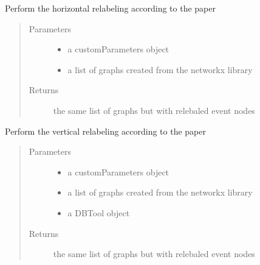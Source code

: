 \documentclass[letterpaper,10pt,english]{sphinxmanual}
\begin{document}
\begin{fulllineitems}
\label{\detokenize{refinement:refinement.labelRefinement.horizontalRefinement}}
Perform the horizontal relabeling according to the paper
\begin{quote}\begin{description}
\item[{Parameters}] \leavevmode\begin{itemize}
\item {} 
 \textendash{} a customParameters object

\item {} 
 \textendash{} a list of graphs created from the networkx library

\end{itemize}

\item[{Returns}] \leavevmode
the same list of graphs but with relebaled event nodes

\end{description}\end{quote}

\end{fulllineitems}


\begin{fulllineitems}
\label{\detokenize{refinement:refinement.labelRefinement.verticalRefinement}}
Perform the vertical relabeling according to the paper
\begin{quote}\begin{description}
\item[{Parameters}] \leavevmode\begin{itemize}
\item {} 
 \textendash{} a customParameters object

\item {} 
 \textendash{} a list of graphs created from the networkx library

\item {} 
 \textendash{} a DBTool object

\end{itemize}

\item[{Returns}] \leavevmode
the same list of graphs but with relebaled event nodes

\end{description}\end{quote}

\end{fulllineitems}
\end{document}
